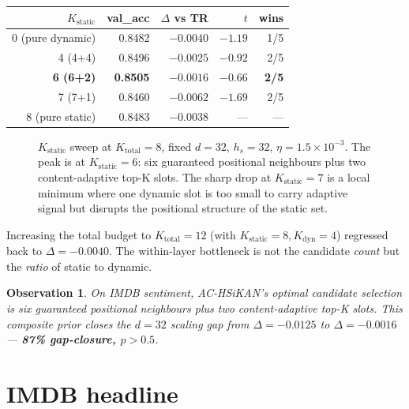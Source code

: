 \documentclass[11pt, a4paper]{article}
\newtheorem{observation}{Observation}
\begin{document}
\begin{center}
\begin{tabular}{rrrrr}
\toprule
$K_{\text{static}}$ & val\_acc & $\Delta$ vs TR & $t$ & wins \\
\midrule
0 (pure dynamic) & 0.8482 & $-0.0040$ & $-1.19$ & 1/5 \\
4 (4+4)          & 0.8496 & $-0.0025$ & $-0.92$ & 2/5 \\
\textbf{6 (6+2)} & \textbf{0.8505} & \textbf{$-0.0016$} & \textbf{$-0.66$} & \textbf{2/5} \\
7 (7+1)          & 0.8460 & $-0.0062$ & $-1.69$ & 2/5 \\
8 (pure static)  & 0.8483 & $-0.0038$ & ---     & --- \\
\bottomrule
\end{tabular}
\end{center}

\begin{figure}[t]
  \centering
  
  \caption{$K_{\text{static}}$ sweep at $K_{\text{total}} = 8$, fixed
  $d=32$, $h_s = 32$, $\eta = 1.5\!\times\!10^{-3}$. The peak is at
  $K_{\text{static}} = 6$: six guaranteed positional neighbours plus
  two content-adaptive top-K slots. The sharp drop at
  $K_{\text{static}} = 7$ is a local minimum where one dynamic slot
  is too small to carry adaptive signal but disrupts the positional
  structure of the static set.}
  \label{fig:kstatic}
\end{figure}

Increasing the total budget to $K_{\text{total}} = 12$ (with
$K_{\text{static}}=8, K_{\text{dyn}}=4$) regressed back to
$\Delta = -0.0040$. The within-layer bottleneck is not the candidate
\emph{count} but the \emph{ratio} of static to dynamic.

\begin{observation}
On IMDB sentiment, AC-HSiKAN's optimal candidate selection is six
guaranteed positional neighbours plus two content-adaptive top-K
slots. This composite prior closes the $d=32$ scaling gap from
$\Delta = -0.0125$ to $\Delta = -0.0016$ --- \textbf{87\% gap-closure,
$p > 0.5$}.
\end{observation}

\section{IMDB headline}
\label{sec:results}
\end{document}
